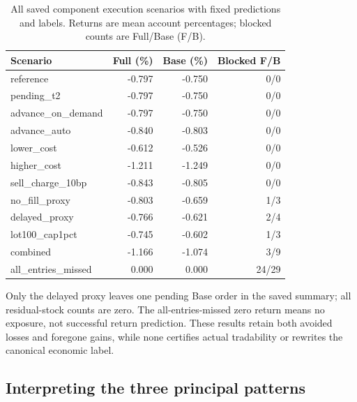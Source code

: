 \begin{table}[htbp]\centering\small{}\setlength{\tabcolsep}{4pt}
\caption[Recorded component execution scenarios]{All saved component execution scenarios with fixed predictions and labels. Returns are mean account percentages; blocked counts are Full/Base (F/B).}\label{tab:execution}
\begin{tabular}{@{}P{.41\linewidth}rrr@{}}\toprule
Scenario & Full (\%) & Base (\%) & Blocked F/B\\\midrule
reference & -0.797 & -0.750 & 0/0\\
pending\_\allowbreak{}t2 & -0.797 & -0.750 & 0/0\\
advance\_\allowbreak{}on\_\allowbreak{}demand & -0.797 & -0.750 & 0/0\\
advance\_\allowbreak{}auto & -0.840 & -0.803 & 0/0\\
lower\_\allowbreak{}cost & -0.612 & -0.526 & 0/0\\
higher\_\allowbreak{}cost & -1.211 & -1.249 & 0/0\\
sell\_\allowbreak{}charge\_\allowbreak{}10bp & -0.843 & -0.805 & 0/0\\
no\_\allowbreak{}fill\_\allowbreak{}proxy & -0.803 & -0.659 & 1/3\\
delayed\_\allowbreak{}proxy & -0.766 & -0.621 & 2/4\\
lot100\_\allowbreak{}cap1pct & -0.745 & -0.602 & 1/3\\
combined & -1.166 & -1.074 & 3/9\\
all\_\allowbreak{}entries\_\allowbreak{}missed & 0.000 & 0.000 & 24/29\\
\bottomrule\end{tabular}\end{table}

Only the delayed proxy leaves one pending Base order in the saved
summary; all residual-stock counts are zero. The all-entries-missed
zero return means no exposure, not successful return prediction. These
results retain both avoided losses and foregone gains, while none
certifies actual tradability or rewrites the canonical economic label.

\subsection{Interpreting the three principal patterns}\label{sec:mechanism-discussion}

